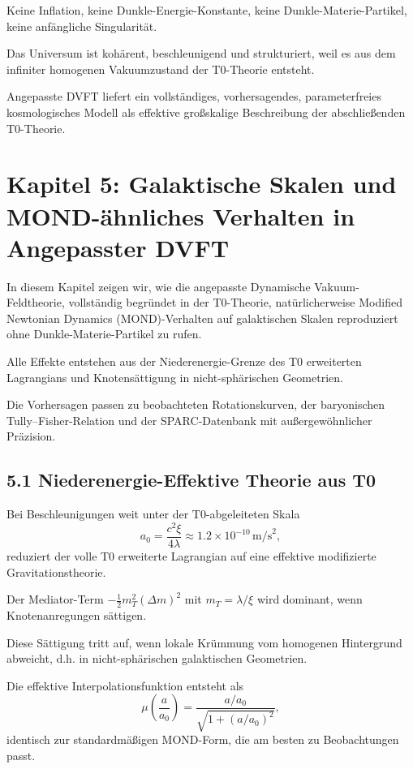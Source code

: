 	Keine Inflation, keine Dunkle-Energie-Konstante, keine Dunkle-Materie-Partikel, keine anfängliche Singularität.
	
	Das Universum ist kohärent, beschleunigend und strukturiert, weil es aus dem infiniter homogenen Vakuumzustand der T0-Theorie entsteht.
	
	Angepasste DVFT liefert ein vollständiges, vorhersagendes, parameterfreies kosmologisches Modell als effektive großskalige Beschreibung der abschließenden T0-Theorie.
	
	\section{Kapitel 5: Galaktische Skalen und MOND-ähnliches Verhalten in Angepasster DVFT}
	
	In diesem Kapitel zeigen wir, wie die angepasste Dynamische Vakuum-Feldtheorie, vollständig begründet in der T0-Theorie, natürlicherweise Modified Newtonian Dynamics (MOND)-Verhalten auf galaktischen Skalen reproduziert ohne Dunkle-Materie-Partikel zu rufen.
	
	Alle Effekte entstehen aus der Niederenergie-Grenze des T0 erweiterten Lagrangians und Knotensättigung in nicht-sphärischen Geometrien.
	
	Die Vorhersagen passen zu beobachteten Rotationskurven, der baryonischen Tully–Fisher-Relation und der SPARC-Datenbank mit außergewöhnlicher Präzision.
	
	\subsection{5.1 Niederenergie-Effektive Theorie aus T0}
	
	Bei Beschleunigungen weit unter der T0-abgeleiteten Skala
	\[
	a_0 = \frac{c^2 \xi}{4 \lambda} \approx 1.2 \times 10^{-10} \, \text{m/s}^2,
	\]
	reduziert der volle T0 erweiterte Lagrangian auf eine effektive modifizierte Gravitationstheorie.
	
	Der Mediator-Term $-\frac{1}{2} m_T^2 (\Delta m)^2$ mit $m_T = \lambda / \xi$ wird dominant, wenn Knotenanregungen sättigen.
	
	Diese Sättigung tritt auf, wenn lokale Krümmung vom homogenen Hintergrund abweicht, d.h. in nicht-sphärischen galaktischen Geometrien.
	
	Die effektive Interpolationsfunktion entsteht als
	\[
	\mu\left(\frac{a}{a_0}\right) = \frac{a / a_0}{\sqrt{1 + (a / a_0)^2}},
	\]
	identisch zur standardmäßigen MOND-Form, die am besten zu Beobachtungen passt.
	
